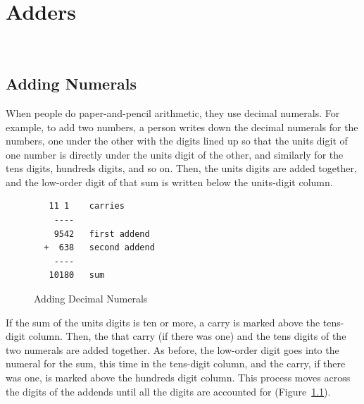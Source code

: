 \chapter{Adders}
\label{ch:adders}\


\section{Adding Numerals}
\label{sec:addition-by-numeral}

When people do paper-and-pencil
arithmetic,
they use decimal numerals.
For example, to add two numbers, a person
writes down the decimal numerals for the numbers,
one under the other with the digits lined up so that
the units digit of one number is directly under
the units digit of the other, and similarly for
the tens digits, hundreds digits, and so on.
Then, the units digits are added together,
and the low-order digit of that sum is written
below the units-digit column.

\begin{figure}
\begin{center}
\begin{minipage}[b]{0.4\textwidth}
\begin{verbatim}
   11 1    carries
    ----
    9542   first addend
  +  638   second addend
    ----
   10180   sum
\end{verbatim}
\end{minipage}
\end{center}
\caption{Adding Decimal Numerals}
\label{fig:adding-decimal-numerals}
\end{figure}

If the sum of the units digits is ten or more, a
carry
is marked above the tens-digit column.
Then, the that carry (if there was one) and
the tens digits of the two numerals are added together.
As before, the low-order digit
goes into the numeral for the sum, this time in the
tens-digit column, and the carry,
if there was one, is marked
above the hundreds digit column.
This process moves across the digits of the addends until all the digits
are accounted for (Figure~\ref{fig:adding-decimal-numerals}).

